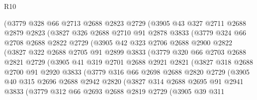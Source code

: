 \begin{lexlean}{R10}
\begin{coremodule}
        (@3779
          @328
          @66
          @2713
          @2688
          @2823
          @2729
          (@3905
            @43
            @327
            @2711
            @2688
            @2879
            @2823
            (@3827
              @326
              @2688
              @2710
              @91
              @2878
              @3833
              (@3779
                @324
                @66
                @2708
                @2688
                @2822
                @2729
                (@3905
                  @42
                  @323
                  @2706
                  @2688
                  @2900
                  @2822
                  (@3827
                    @322
                    @2688
                    @2705
                    @91
                    @2899
                    @3833
                    (@3779
                      @320
                      @66
                      @2703
                      @2688
                      @2821
                      @2729
                      (@3905
                        @41
                        @319
                        @2701
                        @2688
                        @2921
                        @2821
                        (@3827
                          @318
                          @2688
                          @2700
                          @91
                          @2920
                          @3833
                          (@3779
                            @316
                            @66
                            @2698
                            @2688
                            @2820
                            @2729
                            (@3905
                              @40
                              @315
                              @2696
                              @2688
                              @2942
                              @2820
                              (@3827
                                @314
                                @2688
                                @2695
                                @91
                                @2941
                                @3833
                                (@3779
                                  @312
                                  @66
                                  @2693
                                  @2688
                                  @2819
                                  @2729
                                  (@3905
                                    @39
                                    @311

\end{coremodule}
\end{lexlean}
